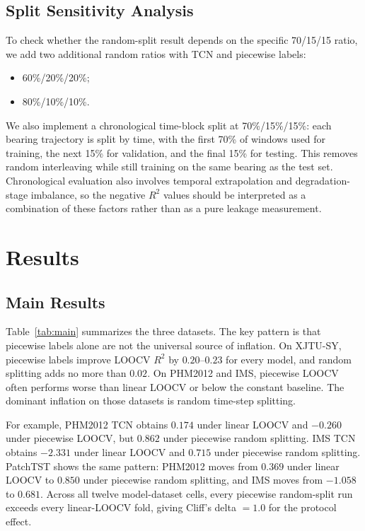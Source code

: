\documentclass[pdflatex,sn-mathphys-num]{sn-jnl}
\begin{document}
\subsection{Split Sensitivity Analysis}
To check whether the random-split result depends on the specific 70/15/15 ratio, we add two additional random ratios with TCN and piecewise labels:
\begin{itemize}
    \item 60\%/20\%/20\%;
    \item 80\%/10\%/10\%.
\end{itemize}
We also implement a chronological time-block split at 70\%/15\%/15\%: each bearing trajectory is split by time, with the first 70\% of windows used for training, the next 15\% for validation, and the final 15\% for testing. This removes random interleaving while still training on the same bearing as the test set. Chronological evaluation also involves temporal extrapolation and degradation-stage imbalance, so the negative $R^2$ values should be interpreted as a combination of these factors rather than as a pure leakage measurement.

\section{Results}
\subsection{Main Results}
Table~\ref{tab:main} summarizes the three datasets. The key pattern is that piecewise labels alone are not the universal source of inflation. On XJTU-SY, piecewise labels improve LOOCV $R^2$ by $0.20$--$0.23$ for every model, and random splitting adds no more than $0.02$. On PHM2012 and IMS, piecewise LOOCV often performs worse than linear LOOCV or below the constant baseline. The dominant inflation on those datasets is random time-step splitting.

For example, PHM2012 TCN obtains $0.174$ under linear LOOCV and $-0.260$ under piecewise LOOCV, but $0.862$ under piecewise random splitting. IMS TCN obtains $-2.331$ under linear LOOCV and $0.715$ under piecewise random splitting. PatchTST shows the same pattern: PHM2012 moves from $0.369$ under linear LOOCV to $0.850$ under piecewise random splitting, and IMS moves from $-1.058$ to $0.681$. Across all twelve model-dataset cells, every piecewise random-split run exceeds every linear-LOOCV fold, giving Cliff's delta $=1.0$ for the protocol effect.
\end{document}
